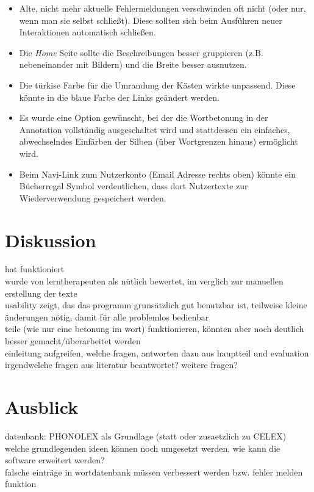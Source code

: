 \begin{itemize}
	\item Alte, nicht mehr aktuelle Fehlermeldungen verschwinden oft nicht (oder nur, wenn man sie selbst schließt). Diese sollten sich beim Ausführen neuer Interaktionen automatisch schließen.
	\item Die \textit{Home} Seite sollte die Beschreibungen besser gruppieren (z.B. nebeneinander mit Bildern) und die Breite besser ausnutzen.
	\item Die türkise Farbe für die Umrandung der Kästen wirkte unpassend. Diese könnte in die blaue Farbe der Links geändert werden.
	\item Es wurde eine Option gewünscht, bei der die Wortbetonung in der Annotation vollständig ausgeschaltet wird und stattdessen ein einfaches, abwechselndes Einfärben der Silben (über Wortgrenzen hinaus) ermöglicht wird.
	\item Beim Navi-Link zum Nutzerkonto (Email Adresse rechts oben) könnte ein Bücherregal Symbol verdeutlichen, dass dort Nutzertexte zur Wiederverwendung gespeichert werden.
\end{itemize}

\newpage
\section{Diskussion}

hat funktioniert\\
wurde von lerntherapeuten als nütlich bewertet, im verglich zur manuellen erstellung der texte\\
usability zeigt, das das programm grunsätzlich gut benutzbar ist, teilweise kleine änderungen nötig, damit für alle problemlos bedienbar\\
teile (wie nur eine betonung im wort) funktionieren, könnten aber noch deutlich besser gemacht/überarbeitet werden\\

einleitung aufgreifen, welche fragen, antworten dazu aus hauptteil und evaluation\\
irgendwelche fragen aus literatur beantwortet?
weitere fragen?

\section{Ausblick}

datenbank: PHONOLEX als Grundlage (statt oder zusaetzlich zu CELEX)\\
welche grundlegenden ideen können noch umgesetzt werden, wie kann die software erweitert werden?\\

falsche einträge in wortdatenbank müssen verbessert werden bzw. fehler melden funktion\\